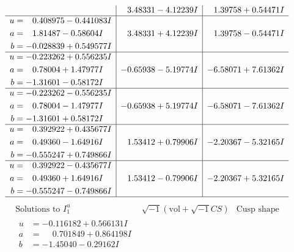 \documentclass[1p]{elsarticle_modified}
\theoremstyle{definition}
\newcommand{\I}{\sqrt{-1}}
\begin{document}
$$\begin{array}{c|c|c}
 & \phantom{-}3.48331 - 4.12239 I & \phantom{-}1.39758 + 0.54471 I \\ \hline\begin{aligned}
u &= \phantom{-}0.408975 - 0.441083 I \\
a &= \phantom{-}1.81487 - 0.58604 I \\
b &= -0.028839 + 0.549577 I\end{aligned}
 & \phantom{-}3.48331 + 4.12239 I & \phantom{-}1.39758 - 0.54471 I \\ \hline\begin{aligned}
u &= -0.223262 + 0.556235 I \\
a &= \phantom{-}0.78004 + 1.47977 I \\
b &= -1.31601 - 0.58172 I\end{aligned}
 & -0.65938 - 5.19774 I & -6.58071 + 7.61362 I \\ \hline\begin{aligned}
u &= -0.223262 - 0.556235 I \\
a &= \phantom{-}0.78004 - 1.47977 I \\
b &= -1.31601 + 0.58172 I\end{aligned}
 & -0.65938 + 5.19774 I & -6.58071 - 7.61362 I \\ \hline\begin{aligned}
u &= \phantom{-}0.392922 + 0.435677 I \\
a &= \phantom{-}0.49360 - 1.64916 I \\
b &= -0.555247 + 0.749866 I\end{aligned}
 & \phantom{-}1.53412 + 0.79906 I & -2.20367 - 5.32165 I \\ \hline\begin{aligned}
u &= \phantom{-}0.392922 - 0.435677 I \\
a &= \phantom{-}0.49360 + 1.64916 I \\
b &= -0.555247 - 0.749866 I\end{aligned}
 & \phantom{-}1.53412 - 0.79906 I & -2.20367 + 5.32165 I\\
 \hline 
 \end{array}$$\newpage$$\begin{array}{c|c|c}  
\text{Solutions to }I^u_{1}& \I (\text{vol} + \sqrt{-1}CS) & \text{Cusp shape}\\
 \hline 
\begin{aligned}
u &= -0.116182 + 0.566131 I \\
a &= \phantom{-}0.701849 + 0.864198 I \\
b &= -1.45040 - 0.29162 I\end{aligned}

\end{array}$$
\end{document}
